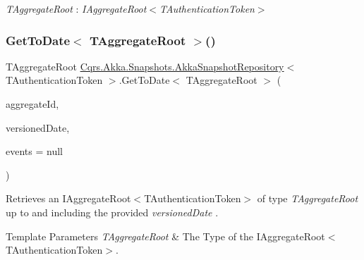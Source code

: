 \begin{Desc}
\item[Type Constraints]\begin{description}
\item[{\em T\+Aggregate\+Root} : {\em I\+Aggregate\+Root$<$T\+Authentication\+Token$>$}]\end{description}
\end{Desc}
\mbox{\label{classCqrs_1_1Akka_1_1Snapshots_1_1AkkaSnapshotRepository_a3c6f3596a5eb42eeefcdf6ed536fb690_a3c6f3596a5eb42eeefcdf6ed536fb690}} 
\subsubsection{\texorpdfstring{Get\+To\+Date$<$ T\+Aggregate\+Root $>$()}{GetToDate< TAggregateRoot >()}}
{\footnotesize\ttfamily T\+Aggregate\+Root \hyperlink{classCqrs_1_1Akka_1_1Snapshots_1_1AkkaSnapshotRepository}{Cqrs.\+Akka.\+Snapshots.\+Akka\+Snapshot\+Repository}$<$ T\+Authentication\+Token $>$.Get\+To\+Date$<$ T\+Aggregate\+Root $>$ (\begin{DoxyParamCaption}\item[{Guid}]{aggregate\+Id,  }\item[{Date\+Time}]{versioned\+Date,  }\item[{I\+List$<$ \hyperlink{interfaceCqrs_1_1Events_1_1IEvent}{I\+Event}$<$ T\+Authentication\+Token $>$$>$}]{events = {\ttfamily null} }\end{DoxyParamCaption})}



Retrieves an I\+Aggregate\+Root$<$\+T\+Authentication\+Token$>$ of type {\itshape T\+Aggregate\+Root}  up to and including the provided {\itshape versioned\+Date} . 


\begin{DoxyTemplParams}{Template Parameters}
{\em T\+Aggregate\+Root} & The Type of the I\+Aggregate\+Root$<$\+T\+Authentication\+Token$>$.\\
\hline
\end{DoxyTemplParams}

